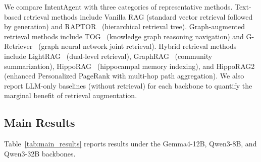 \documentclass[runningheads]{llncs}
\begin{document}
We compare IntentAgent with three categories of representative methods. Text-based retrieval methods include Vanilla RAG (standard vector retrieval followed by generation) and RAPTOR~\cite{ref23} (hierarchical retrieval tree). Graph-augmented retrieval methods include TOG~\cite{ref24} (knowledge graph reasoning navigation) and G-Retriever~\cite{ref25} (graph neural network joint retrieval). Hybrid retrieval methods include LightRAG~\cite{ref26} (dual-level retrieval), GraphRAG~\cite{ref27} (community summarization), HippoRAG~\cite{ref28} (hippocampal memory indexing), and HippoRAG2~\cite{ref30} (enhanced Personalized PageRank with multi-hop path aggregation). We also report LLM-only baselines (without retrieval) for each backbone to quantify the marginal benefit of retrieval augmentation.

\subsection{Main Results}

Table~\ref{tab:main_results} reports results under the Gemma4-12B, Qwen3-8B, and Qwen3-32B backbones.
\end{document}
